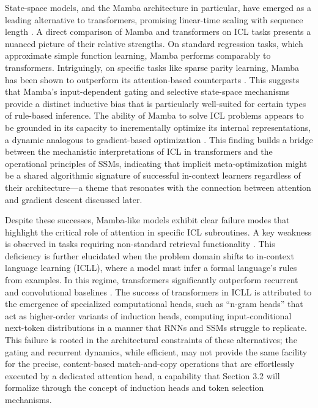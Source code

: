 \documentclass[11pt]{article}
\begin{document}
State-space models, and the Mamba architecture in particular, have emerged as a leading alternative to transformers, promising linear-time scaling with sequence length \cite{ref87}. A direct comparison of Mamba and transformers on ICL tasks presents a nuanced picture of their relative strengths. On standard regression tasks, which approximate simple function learning, Mamba performs comparably to transformers. Intriguingly, on specific tasks like sparse parity learning, Mamba has been shown to outperform its attention-based counterparts \cite{ref88}. This suggests that Mamba's input-dependent gating and selective state-space mechanisms provide a distinct inductive bias that is particularly well-suited for certain types of rule-based inference. The ability of Mamba to solve ICL problems appears to be grounded in its capacity to incrementally optimize its internal representations, a dynamic analogous to gradient-based optimization \cite{ref89}. This finding builds a bridge between the mechanistic interpretations of ICL in transformers and the operational principles of SSMs, indicating that implicit meta-optimization might be a shared algorithmic signature of successful in-context learners regardless of their architecture---a theme that resonates with the connection between attention and gradient descent discussed later.

Despite these successes, Mamba-like models exhibit clear failure modes that highlight the critical role of attention in specific ICL subroutines. A key weakness is observed in tasks requiring non-standard retrieval functionality \cite{ref88}. This deficiency is further elucidated when the problem domain shifts to in-context language learning (ICLL), where a model must infer a formal language's rules from examples. In this regime, transformers significantly outperform recurrent and convolutional baselines \cite{ref60}. The success of transformers in ICLL is attributed to the emergence of specialized computational heads, such as ``n-gram heads'' that act as higher-order variants of induction heads, computing input-conditional next-token distributions in a manner that RNNs and SSMs struggle to replicate. This failure is rooted in the architectural constraints of these alternatives; the gating and recurrent dynamics, while efficient, may not provide the same facility for the precise, content-based match-and-copy operations that are effortlessly executed by a dedicated attention head, a capability that Section 3.2 will formalize through the concept of induction heads and token selection mechanisms.
\end{document}
